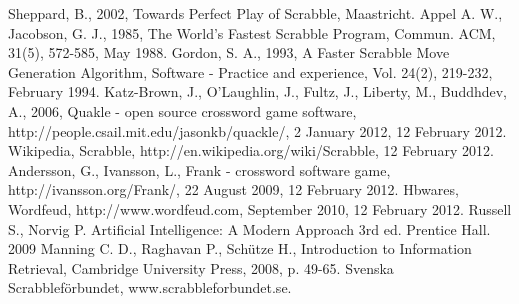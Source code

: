\documentclass[a4paper, 12pt]{report}
\begin{document}
\begin{thebibliography}{100}  
   Sheppard, B., 2002, Towards Perfect Play of Scrabble, Maastricht.
   Appel A. W., Jacobson, G. J., 1985, The World’s Fastest Scrabble Program, Commun. ACM, 31(5), 572-585, May 1988.
 Gordon, S. A., 1993, A Faster Scrabble Move Generation Algorithm, Software - Practice and experience, Vol. 24(2), 219-232, February 1994.
 Katz-Brown, J., O’Laughlin, J., Fultz, J., Liberty, M., Buddhdev, A., 2006, Quakle - open source crossword game software, http://people.csail.mit.edu/jasonkb/quackle/, 2 January 2012,  12 February 2012.
 Wikipedia, Scrabble, http://en.wikipedia.org/wiki/Scrabble, 12 February 2012.
 Andersson, G., Ivansson, L., Frank - crossword software game, http://ivansson.org/Frank/, 22 August 2009, 12 February 2012.
 Hbwares, Wordfeud, http://www.wordfeud.com, September 2010, 12 February 2012.
 Russell S., Norvig P. Artificial Intelligence: A Modern Approach 3rd ed. Prentice Hall. 2009
 Manning C. D., Raghavan P., Schütze H., Introduction to Information Retrieval, Cambridge University Press, 2008, p. 49-65.
 Svenska Scrabbleförbundet, www.scrabbleforbundet.se.
\end{thebibliography}
\end{document}
